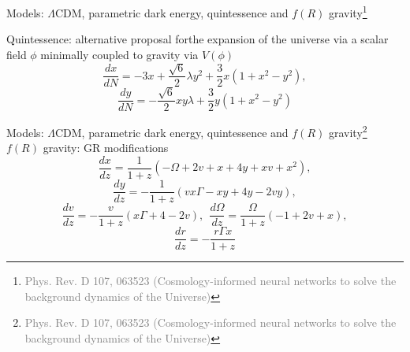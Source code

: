 \documentclass[aspectratio=169, 12pt]{beamer}
\newcommand{\gray}[1]{\textcolor{gray}{#1}}
\begin{document}
\begin{frame}{Models: \alert{$\Lambda$CDM}, \alert{parametric dark energy}, \alert{quintessence}  and \alert{$f(R)$ gravity}\footnote{\tiny{\gray{Phys. Rev. D 107, 063523 (Cosmology-informed neural networks to solve the background dynamics of the Universe)}}}}

\alert{Quintessence:} alternative proposal forthe expansion of the universe via a scalar field $\phi$ minimally coupled to gravity via $V(\phi)$\pause
\begin{displaymath}
  \frac{dx}{dN} = -3x+\frac{\sqrt{6}}{2}\lambda y^2 + \frac{3}{2}x\left( 1+x^2-y^2\right),
\end{displaymath}
\begin{displaymath}
  \frac{dy}{dN} = -\frac{
  \sqrt{6}}{2}xy\lambda + \frac{3}{2}y\left(1+x^2-y^2\right)
\end{displaymath}
\end{frame}
\begin{frame}{Models: \alert{$\Lambda$CDM}, \alert{parametric dark energy}, \alert{quintessence}  and \alert{$f(R)$ gravity}\footnote{\tiny{\gray{Phys. Rev. D 107, 063523 (Cosmology-informed neural networks to solve the background dynamics of the Universe)}}}}
\alert{$f(R)$ gravity:} GR modifications\pause
\begin{displaymath}
  \frac{dx}{dz} = \frac{1}{1+z}\left( -\Omega + 2v + x + 4y + xv + x^2\right),
\end{displaymath}
\begin{displaymath}
  \frac{dy}{dz} = -\frac{1}{1+z}\left( vx\Gamma - xy + 4y - 2vy\right),
\end{displaymath}
\begin{displaymath}
  \frac{dv}{dz} = -\frac{v}{1+z}\left( x\Gamma + 4 -2v\right),\ \ \frac{d\Omega}{dz} = \frac{\Omega}{1+z}\left(-1 + 2v + x\right),
\end{displaymath}
\begin{displaymath}
  \frac{dr}{dz} = -\frac{r\Gamma x}{1+z}
\end{displaymath}
\end{frame}
\end{document}
